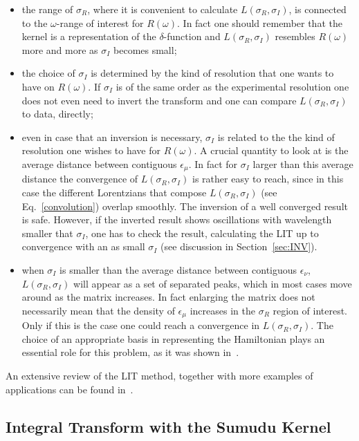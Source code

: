 \begin{itemize}
 \item the range of $\sigma_R$, where it is convenient to calculate $L(\sigma_R,\sigma_I)$, is connected 
to the $\omega$-range of interest for $R(\omega)$. In fact one should remember that the kernel is a representation of the 
$\delta$-function and $L(\sigma_R,\sigma_I)$ resembles $R(\omega)$ more and more as $\sigma_I$ becomes small; 
 \item the choice of $\sigma_I$
is determined by the kind of resolution that one wants to have on $R(\omega)$. If $\sigma_I$ 
is of the same order as the experimental resolution one does not even need to invert the transform and one can compare 
$L(\sigma_R,\sigma_I)$ to data, directly; 
  \item even in case that an inversion is necessary, $\sigma_I$ is related to the  
the kind of resolution one wishes to have for $R(\omega)$. A crucial quantity to look 
at is the average distance between contiguous $\epsilon_\mu$.
In fact  for  $\sigma_I$ larger than this  average distance the convergence 
of  $L(\sigma_R,\sigma_I)$ is rather easy to reach, since in this case  the different Lorentzians that compose $L(\sigma_R,\sigma_I)$
(see Eq.~\ref{convolution}) overlap smoothly. 
The inversion of a 
well converged result is safe. However, if the inverted result shows oscillations with wavelength smaller that $\sigma_I$, one has to
check the result, calculating the LIT up to convergence with an as small $\sigma_I$ (see discussion in Section~\ref{sec:INV}). 
\item when $\sigma_I$ is smaller 
than the average distance between contiguous $\epsilon_\nu$, $L(\sigma_R,\sigma_I)$ will appear as a set of separated peaks,
which in most cases move around as the matrix increases. In fact enlarging the matrix does not necessarily mean that the density of 
$\epsilon_\mu$ increases in the $\sigma_R$  region of interest. Only if this is the case one could reach a convergence 
in $L(\sigma_R,\sigma_I)$. The choice of an appropriate basis in representing the Hamiltonian plays an essential role for 
this problem, as it was shown in~\cite{Leidemann_2015}.
\end{itemize}

An extensive review of the LIT method, together with more examples of applications can be found in~\cite{report_2007}.

\subsection{Integral Transform with the Sumudu Kernel}\label{sec:SUMUDU}

